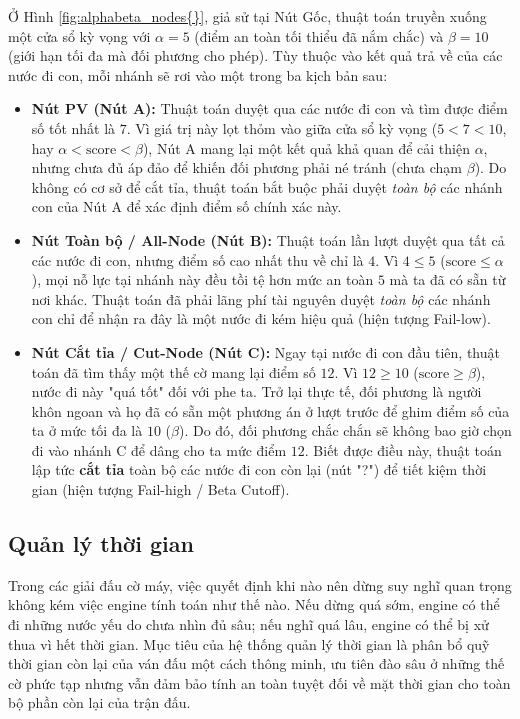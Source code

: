Ở Hình \ref{fig:alphabeta_nodes{}}, giả sử tại Nút Gốc, thuật toán truyền xuống một cửa sổ kỳ vọng với $\alpha=5$ (điểm an toàn tối thiểu đã nắm chắc) và $\beta=10$ (giới hạn tối đa mà đối phương cho phép). Tùy thuộc vào kết quả trả về của các nước đi con, mỗi nhánh sẽ rơi vào một trong ba kịch bản sau:

\begin{itemize}
    \item \textbf{Nút PV (Nút A):} Thuật toán duyệt qua các nước đi con và tìm được điểm số tốt nhất là $7$. Vì giá trị này lọt thỏm vào giữa cửa sổ kỳ vọng ($5 < 7 < 10$, hay $\alpha < \text{score} < \beta$), Nút A mang lại một kết quả khả quan để cải thiện $\alpha$, nhưng chưa đủ áp đảo để khiến đối phương phải né tránh (chưa chạm $\beta$). Do không có cơ sở để cắt tỉa, thuật toán bắt buộc phải duyệt \textit{toàn bộ} các nhánh con của Nút A để xác định điểm số chính xác này.
    
    \item \textbf{Nút Toàn bộ / All-Node (Nút B):} Thuật toán lần lượt duyệt qua tất cả các nước đi con, nhưng điểm số cao nhất thu về chỉ là $4$. Vì $4 \le 5$ ($\text{score} \le \alpha$), mọi nỗ lực tại nhánh này đều tồi tệ hơn mức an toàn $5$ mà ta đã có sẵn từ nơi khác. Thuật toán đã phải lãng phí tài nguyên duyệt \textit{toàn bộ} các nhánh con chỉ để nhận ra đây là một nước đi kém hiệu quả (hiện tượng Fail-low).
    
    \item \textbf{Nút Cắt tỉa / Cut-Node (Nút C):} Ngay tại nước đi con đầu tiên, thuật toán đã tìm thấy một thế cờ mang lại điểm số $12$. Vì $12 \ge 10$ ($\text{score} \ge \beta$), nước đi này "quá tốt" đối với phe ta. Trở lại thực tế, đối phương là người khôn ngoan và họ đã có sẵn một phương án ở lượt trước để ghim điểm số của ta ở mức tối đa là $10$ ($\beta$). Do đó, đối phương chắc chắn sẽ không bao giờ chọn đi vào nhánh C để dâng cho ta mức điểm $12$. Biết được điều này, thuật toán lập tức \textbf{cắt tỉa} toàn bộ các nước đi con còn lại (nút "?") để tiết kiệm thời gian (hiện tượng Fail-high / Beta Cutoff).
\end{itemize}


\subsection{Quản lý thời gian}

Trong các giải đấu cờ máy, việc quyết định khi nào nên dừng suy nghĩ quan trọng không kém việc engine tính toán như thế nào. Nếu dừng quá sớm, engine có thể đi những nước yếu do chưa nhìn đủ sâu; nếu nghĩ quá lâu, engine có thể bị xử thua vì hết thời gian. Mục tiêu của hệ thống quản lý thời gian là phân bổ quỹ thời gian còn lại của ván đấu một cách thông minh, ưu tiên đào sâu ở những thế cờ phức tạp nhưng vẫn đảm bảo tính an toàn tuyệt đối về mặt thời gian cho toàn bộ phần còn lại của trận đấu.

